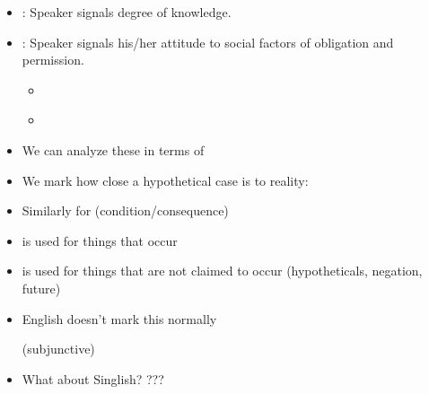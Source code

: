 \documentclass[headrule,footrule]{foils}
\begin{document}
\begin{itemize}
\item  {}: Speaker signals degree of  
knowledge.
\begin{exe}
  \ex {} 
\end{exe}
\item  {}: Speaker signals his/her attitude  
to social factors of obligation and permission.
\begin{itemize}
\item {}
  \begin{exe}
    \ex {}  
    \ex {}  
  \end{exe}
\item {}
  \begin{exe}
    \ex {}  
    \ex {} 
  \end{exe}
\end{itemize}
\end{itemize}


\begin{itemize}
\item We can analyze these in terms of 
\item We mark how close a hypothetical case is to reality:
  \begin{exe}
    \ex {}
  \end{exe}
\item Similarly for  (condition/consequence)
  \begin{exe}
    \ex {}
    \ex {}
    \ex {}
  \end{exe}
\end{itemize}

\begin{itemize}
\item  {} is used for things that occur
\item  {} is used for things that are not claimed to 
occur (hypotheticals, negation, future)
\item  English doesn't mark this normally
  \begin{exe}
    \ex {} \textnormal (subjunctive)
  \end{exe}
\item  What about Singlish? ???
 \begin{exe}
    \ex {}
    \ex {}
    \ex {}
  \end{exe}
\end{itemize}
\end{document}
